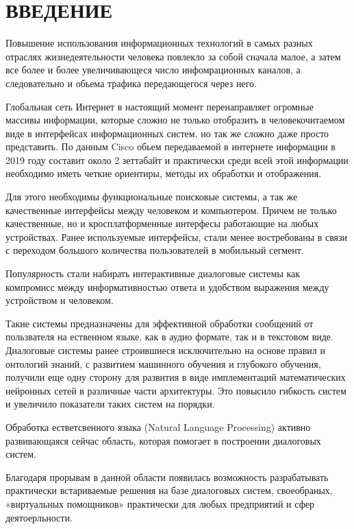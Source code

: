 \chapter*{\MakeUppercase{Введение}}
Повышение использования информационных технологий в самых разных отраслях жизнедеятельности человека повлекло за собой сначала малое, а затем все более и более увеличивающеся число инфомрационных каналов, а следовательно и обьема трафика передающегося через него.  

Глобальная сеть Интернет в настоящий момент перенаправляет огромные массивы информации, которые сложно не только отобразить в человекочитаемом виде в интерфейсах информационных систем, но так же сложно даже просто представить. 
По данным Cisco обьем передаваемой в интернете информации в 2019 году составит около 2 зеттабайт \cite{cisco} и практически среди всей этой информации необходимо иметь четкие ориентиры, методы их обработки и отображения. 

Для этого необходимы функциональные поисковые системы, а так же качественные интерфейсы между человеком и компьютером. Причем не только качественные, но и кросплатформенные интерфесы работающие на любых устройствах. Ранее используемые интерфейсы, стали менее востребованы в связи с переходом большого количества пользователей в мобильный сегмент. 

Популярность стали набирать интерактивные диалоговые системы как компромисс  между информативностью ответа и удобством выражения между устройством и человеком. 

Такие системы предназначены для эффективной обработки сообщений от пользвателя на ественном языке, как в аудио формате, так и в текстовом виде. Диалоговые системы ранее строившиеся исключительно на основе правил и онтологий знаний, с развитием машинного обучения и глубокого обучения, получили еще одну сторону для развития в виде имплементаций математических нейронных сетей в различные части архитектуры. Это повысило гибкость систем и увеличило показатели таких систем на порядки. 

Обработка естветсвенного языка (Natural Language Processing) активно развивающаяся сейчас область, которая помогает в построении диалоговых систем.

Благодаря прорывам в данной области появилась возможность разрабатывать практически встариваемые решения на базе диалоговых систем, своеобраных, «виртуальных помощников» практически для любых предприятий и сфер деятоерльности. 

